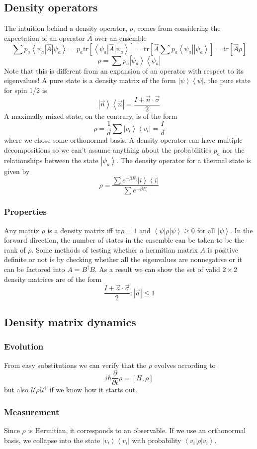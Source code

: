 \documentclass{article}
\newcommand{\bra}[1]{\left\langle #1 \right|}
\newcommand{\ket}[1]{\left|#1\right\rangle}
\begin{document}
\subsection{Density operators}
The intuition behind a density operator, $\rho$, comes from considering the expectation of an operator $\hat A$ over an ensemble
$$\sum p_a \bra{\psi_a} \hat A \ket{\psi_a} = p_a \text{tr}[\bra{\psi_a} \hat A \ket{\psi_a}]=\text{tr}\left[\hat A \sum p_a\bra{\psi_a}\ket{\psi_a}\right]=\text{tr}[\hat A \rho]$$
$$\rho = \sum p_a \ket{\psi_a}\bra{\psi_a}$$
Note that this is different from an expansion of an operator with respect to its eigenvalues! A pure state is a density matrix of the form $\ket{\psi}\bra{\psi}$, the pure state for spin 1/2 is 
$$\ket{\vec n}\bra{\vec n}=\frac{I+\vec n \cdot \vec \sigma}{2}$$
A maximally mixed state, on the contrary, is of the form
$$\rho = \frac{1}{d}\sum \ket{v_i}\bra{v_i} = \frac{I}{d}$$
where we chose some orthonormal basis. A density operator can have multiple decompositions so we can't assume anything about the probabilities $p_a$ nor the relationships between the state $\ket{\psi_a}$. The density operator for a thermal state is given by 
$$\rho = \frac{\sum e^{-\beta E_i} \ket{i}\bra{i}}{\sum e^{-\beta E_i}}$$
\subsubsection{Properties}
Any matrix $\rho$ is a density matrix iff $\text{tr} \rho = 1$ and $\bra{\psi}\rho\ket{\psi}\geq 0$ for all $\ket{\psi}$. In the forward direction, the number of states in the ensemble can be taken to be the rank of $\rho$. Some methods of testing whether a hermitian matrix $A$ is positive definite or not is by checking whether all the eigenvalues are nonnegative or it can be factored into $A=B^{\dagger} B$. As a result we can show the set of valid $2 \times 2$ density matrices are of the form 
$$\frac{I+\vec a \cdot \vec \sigma}{2}: |\vec a|\leq 1$$
\subsection{Density matrix dynamics}
\subsubsection{Evolution}
From easy substitutions we can verify that the $\rho$ evolves according to $$i\hbar \frac{\partial}{\partial t} \rho = [H, \rho]$$
but also $\mathcal{U}\rho \mathcal{U}^{\dagger}$ if we know how it starts out.
\subsubsection{Measurement}
Since $\rho$ is Hermitian, it corresponds to an observable. If we use an orthonormal basis, we collapse into the state $\ket{v_i}\bra{v_i}$ with probability $\bra{v_i} \rho \ket{v_i}$.
\end{document}
